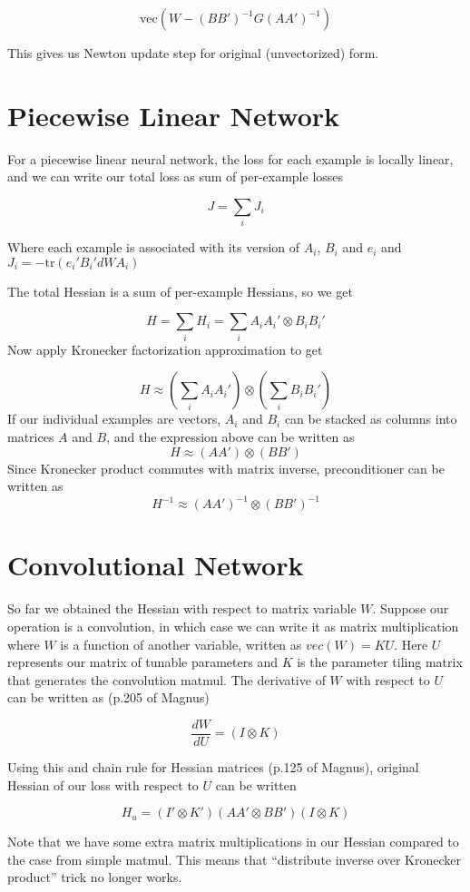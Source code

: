 \documentclass{article}
\begin{document}
$$\text{vec}(W-(BB')^{-1} G (AA')^{-1})$$

This gives us Newton update step for original (unvectorized) form.


\section*{Piecewise Linear Network}
For a piecewise linear neural network, the loss for each example is locally linear, and we can write our total loss as sum of per-example losses

$$J = \sum_i J_i$$

Where each example is associated with its version of $A_i$, $B_i$ and $e_i$ and $J_i = -\text{tr}(e_i'B_i'dWA_i)$

The total Hessian is a sum of per-example Hessians, so we get

$$H = \sum_i H_i = \sum_i A_iA_i'\otimes B_iB_i'$$
Now apply Kronecker factorization approximation to get

$$H \approx \left(\sum_i A_iA_i'\right)\otimes \left(\sum_iB_iB_i'\right)$$
If our individual examples are vectors, $A_i$ and $B_i$ can be stacked as columns into matrices $A$ and $B$, and the expression above can be written as
$$H \approx \left(AA'\right)\otimes \left(BB'\right)$$
Since Kronecker product commutes with matrix inverse, preconditioner can be written as
$$H^{-1}\approx \left(AA'\right)^{-1}\otimes \left(BB'\right)^{-1}$$

\section*{Convolutional Network}
So far we obtained the Hessian with respect to matrix variable $W$. Suppose our operation is a convolution, in which case we can write it as matrix multiplication where $W$ is a function of another variable, written as $vec(W)=KU$. Here $U$ represents our matrix of tunable parameters and $K$ is the parameter tiling matrix that generates the convolution matmul. The derivative of $W$ with respect to $U$ can be written as (p.205 of Magnus)

$$\frac{dW}{dU} = (I\otimes K)$$

Using this and chain rule for Hessian matrices (p.125 of Magnus), original Hessian of our loss with respect to $U$ can be written 

$$H_u=(I'\otimes K')(AA'\otimes BB')(I\otimes K)$$

Note that we have some extra matrix multiplications in our Hessian compared to the case from simple matmul. This means that ``distribute inverse over Kronecker product'' trick no longer works.
\end{document}
